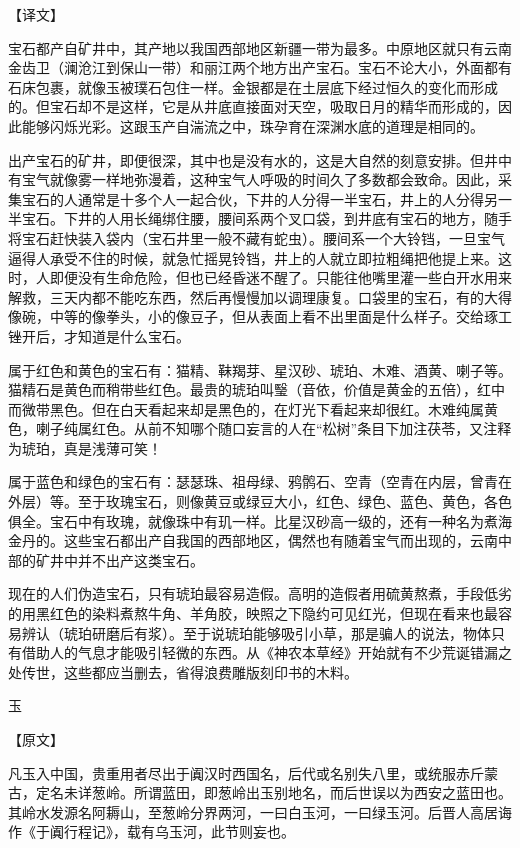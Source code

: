 \documentclass[12pt,UTF8]{ctexbook}
\begin{document}
【译文】

宝石都产自矿井中，其产地以我国西部地区新疆一带为最多。中原地区就只有云南金齿卫（澜沧江到保山一带）和丽江两个地方出产宝石。宝石不论大小，外面都有石床包裹，就像玉被璞石包住一样。金银都是在土层底下经过恒久的变化而形成的。但宝石却不是这样，它是从井底直接面对天空，吸取日月的精华而形成的，因此能够闪烁光彩。这跟玉产自湍流之中，珠孕育在深渊水底的道理是相同的。

出产宝石的矿井，即便很深，其中也是没有水的，这是大自然的刻意安排。但井中有宝气就像雾一样地弥漫着，这种宝气人呼吸的时间久了多数都会致命。因此，采集宝石的人通常是十多个人一起合伙，下井的人分得一半宝石，井上的人分得另一半宝石。下井的人用长绳绑住腰，腰间系两个叉口袋，到井底有宝石的地方，随手将宝石赶快装入袋内（宝石井里一般不藏有蛇虫）。腰间系一个大铃铛，一旦宝气逼得人承受不住的时候，就急忙摇晃铃铛，井上的人就立即拉粗绳把他提上来。这时，人即便没有生命危险，但也已经昏迷不醒了。只能往他嘴里灌一些白开水用来解救，三天内都不能吃东西，然后再慢慢加以调理康复。口袋里的宝石，有的大得像碗，中等的像拳头，小的像豆子，但从表面上看不出里面是什么样子。交给琢工锉开后，才知道是什么宝石。

属于红色和黄色的宝石有：猫精、靺羯芽、星汉砂、琥珀、木难、酒黄、喇子等。猫精石是黄色而稍带些红色。最贵的琥珀叫瑿（音依，价值是黄金的五倍），红中而微带黑色。但在白天看起来却是黑色的，在灯光下看起来却很红。木难纯属黄色，喇子纯属红色。从前不知哪个随口妄言的人在“松树”条目下加注茯苓，又注释为琥珀，真是浅薄可笑！

属于蓝色和绿色的宝石有：瑟瑟珠、祖母绿、鸦鹘石、空青（空青在内层，曾青在外层）等。至于玫瑰宝石，则像黄豆或绿豆大小，红色、绿色、蓝色、黄色，各色俱全。宝石中有玫瑰，就像珠中有玑一样。比星汉砂高一级的，还有一种名为煮海金丹的。这些宝石都出产自我国的西部地区，偶然也有随着宝气而出现的，云南中部的矿井中并不出产这类宝石。

现在的人们伪造宝石，只有琥珀最容易造假。高明的造假者用硫黄熬煮，手段低劣的用黑红色的染料煮熬牛角、羊角胶，映照之下隐约可见红光，但现在看来也最容易辨认（琥珀研磨后有浆）。至于说琥珀能够吸引小草，那是骗人的说法，物体只有借助人的气息才能吸引轻微的东西。从《神农本草经》开始就有不少荒诞错漏之处传世，这些都应当删去，省得浪费雕版刻印书的木料。

玉

【原文】

凡玉入中国，贵重用者尽出于阗汉时西国名，后代或名别失八里，或统服赤斤蒙古，定名未详葱岭。所谓蓝田，即葱岭出玉别地名，而后世误以为西安之蓝田也。其岭水发源名阿耨山，至葱岭分界两河，一曰白玉河，一曰绿玉河。后晋人高居诲作《于阗行程记》，载有乌玉河，此节则妄也。
\end{document}
